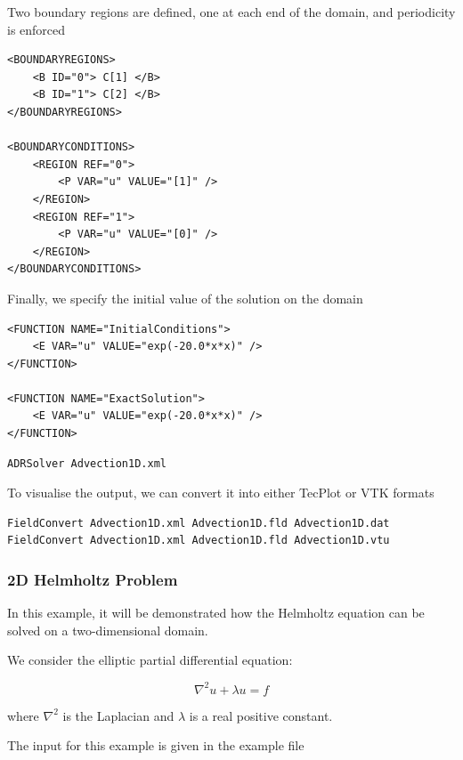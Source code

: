 Two boundary regions are defined, one at each end of the domain, and periodicity
is enforced
\begin{lstlisting}[style=XMLStyle] 
<BOUNDARYREGIONS>
    <B ID="0"> C[1] </B>
    <B ID="1"> C[2] </B>
</BOUNDARYREGIONS>

<BOUNDARYCONDITIONS>
    <REGION REF="0">
        <P VAR="u" VALUE="[1]" />
    </REGION>
    <REGION REF="1">
        <P VAR="u" VALUE="[0]" />
    </REGION>
</BOUNDARYCONDITIONS>
\end{lstlisting}

Finally, we specify the initial value of the solution on the domain
\begin{lstlisting}[style=XMLStyle]
<FUNCTION NAME="InitialConditions">
    <E VAR="u" VALUE="exp(-20.0*x*x)" />
</FUNCTION>

<FUNCTION NAME="ExactSolution">
    <E VAR="u" VALUE="exp(-20.0*x*x)" />
</FUNCTION>
\end{lstlisting}

\begin{lstlisting}[style=BashInputStyle]
ADRSolver Advection1D.xml
\end{lstlisting}

To visualise the output, we can convert it into either TecPlot or VTK formats
\begin{lstlisting}[style=BashInputStyle]
FieldConvert Advection1D.xml Advection1D.fld Advection1D.dat
FieldConvert Advection1D.xml Advection1D.fld Advection1D.vtu
\end{lstlisting}


\subsubsection{2D Helmholtz Problem}

In this example, it will be demonstrated how the Helmholtz equation can be solved on a two-dimensional domain.


We consider the elliptic partial differential equation:

\begin{equation}
\nabla^2 u  + \lambda u =  f
\end{equation}

where $\nabla^2$ is the Laplacian and $\lambda$ is a real positive constant.


The input for this example is given in the example file

